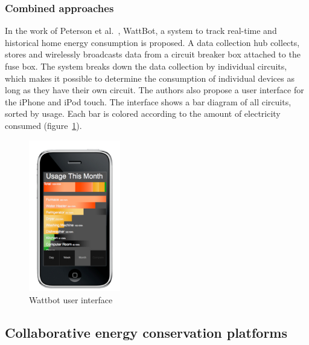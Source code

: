\subsubsection{Combined approaches}
In the work of Peterson et al.~\cite{Petersen_2009}, WattBot, a system to track real-time and historical home energy consumption is proposed.  
A data collection hub collects, stores and wirelessly broadcasts data from a circuit breaker box attached to the fuse box. The system breaks down the data collection by individual circuits, which makes it possible to determine the consumption of individual devices as long as they have their own circuit. The authors also propose a user interface for the iPhone and iPod touch. The interface shows a bar diagram of all circuits, sorted by usage. Each bar is colored according to the amount of electricity consumed (figure~\ref{wattbot}).

\begin{figure}[htbp]
\begin{center}
\includegraphics[width=4cm]{Images/wattbot.jpg}
\caption{Wattbot user interface}
\label{wattbot}
\end{center}
\end{figure} 
 

\subsection{Collaborative energy conservation platforms}
